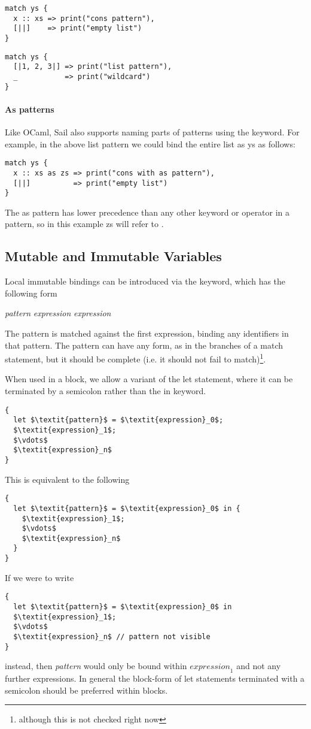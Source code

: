 \begin{lstlisting}
match ys {
  x :: xs => print("cons pattern"),
  [||]    => print("empty list")
}
\end{lstlisting}

\begin{lstlisting}
match ys {
  [|1, 2, 3|] => print("list pattern"),
  _           => print("wildcard")
}
\end{lstlisting}

\paragraph{As patterns}

Like OCaml, Sail also supports naming parts of patterns using the
 keyword. For example, in the above list pattern we could bind
the entire list as ys as follows:
\begin{lstlisting}
match ys {
  x :: xs as zs => print("cons with as pattern"),
  [||]          => print("empty list")
}
\end{lstlisting}
The as pattern has lower precedence than any other keyword or operator
in a pattern, so in this example zs will refer to .

\subsection{Mutable and Immutable Variables}

Local immutable bindings can be introduced via the  keyword,
which has the following form
\begin{center}
   \textit{pattern} \ll{=} \textit{expression}  \textit{expression}
\end{center}
The pattern is matched against the first expression, binding any
identifiers in that pattern. The pattern can have any form, as in the
branches of a match statement, but it should be complete (i.e. it
should not fail to match)\footnote{although this is not checked right
  now}.

When used in a block, we allow a variant of the let statement, where
it can be terminated by a semicolon rather than the in keyword.
\begin{lstlisting}[mathescape]
{
  let $\textit{pattern}$ = $\textit{expression}_0$;
  $\textit{expression}_1$;
  $\vdots$
  $\textit{expression}_n$
}
\end{lstlisting}
This is equivalent to the following
\begin{lstlisting}[mathescape]
{
  let $\textit{pattern}$ = $\textit{expression}_0$ in {
    $\textit{expression}_1$;
    $\vdots$
    $\textit{expression}_n$
  }
}
\end{lstlisting}
If we were to write
\begin{lstlisting}[mathescape]
{
  let $\textit{pattern}$ = $\textit{expression}_0$ in
  $\textit{expression}_1$;
  $\vdots$
  $\textit{expression}_n$ // pattern not visible
}
\end{lstlisting}
instead, then \textit{pattern} would only be bound within
$\textit{expression}_1$ and not any further expressions. In general
the block-form of let statements terminated with a semicolon should be
preferred within blocks.

